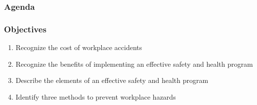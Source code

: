 
\def\PresTitle{Managing Safety and Health Programs}     %
\def\PresSubtitle{Baker College Engineering}            %
\def\PresAuthor{Brad Peirson}                           %
\def\PresInstitute{College of Information Technology and Engineering}       %
\def\PresDate{}                                         %
\def\PresKeywords{}                                     %





\maketitle              %

\begin{frame}
    \frametitle{Agenda}
    \begingroup
        \setlength{\parskip}{0.3em} 
        
        
        \setcounter{tocdepth}{1} %
    \tableofcontents
    \setcounter{tocdepth}{2} %
    \endgroup
\end{frame}

\begin{frame}
    \frametitle{Objectives}
    \begin{enumerate}[<+- | alert@+>]
        \item Recognize the cost of workplace accidents
        \item Recognize the benefits of implementing an effective safety and health program
        \item Describe the elements of an effective safety and health program
        \item Identify three methods to prevent workplace hazards
    \end{enumerate}
\end{frame}

